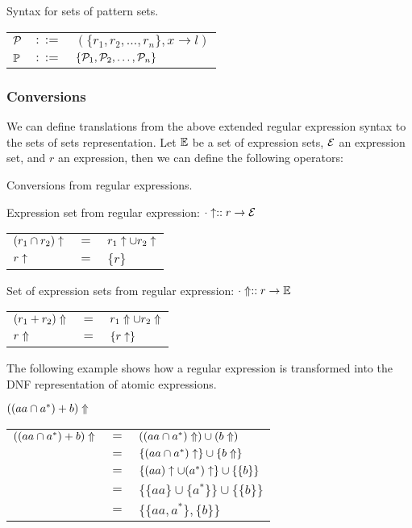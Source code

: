\begin{defn}
   Syntax for sets of pattern sets.

   \begin{tabular}{lll}
      $\mathcal{P}$	& $::=$ & $(\{r_1, r_2, \dots, r_n\}, x \to l)$ \\
      $\mathbb{P}$	& $::=$ & $\{\mathcal{P}_1, \mathcal{P}_2, \dots, \mathcal{P}_n\}$ \\
   \end{tabular}
\end{defn}


\subsubsection{Conversions}

We can define translations from the above extended regular expression syntax to
the sets of sets representation. Let $\mathbb{E}$ be a set of expression sets,
$\mathcal{E}$ an expression set, and $r$ an expression, then we can define the
following operators:

\begin{defn}
   Conversions from regular expressions.

   Expression set from regular expression:
   $\cdot\uparrow :: r \to \mathcal{E}$

   \begin{tabular}{lll}
      $(r_1 \cap r_2)\uparrow$	& $=$	& $r_1\uparrow \cup r_2\uparrow$	\\
      $r\uparrow$			& $=$	& $\{r\}$			\\
   \end{tabular}

   Set of expression sets from regular expression:
   $\cdot\Uparrow :: r \to \mathbb{E}$

   \begin{tabular}{lll}
      $(r_1 + r_2)\Uparrow$	& $=$	& $r_1\Uparrow \cup r_2\Uparrow$	\\
      $r\Uparrow$		& $=$	& $\{r\uparrow\}$			\\
   \end{tabular}
\end{defn}

The following example shows how a regular expression is transformed into the DNF
representation of atomic expressions.

\begin{eg}
   $((aa \cap a^*) + b)\Uparrow$

   \begin{tabular}{lll}
      $((aa \cap a^*) + b)\Uparrow$
      & $=$	& $((aa \cap a^*)\Uparrow) \cup (b\Uparrow)$		\\
      & $=$	& $\{(aa \cap a^*)\uparrow\} \cup \{b\Uparrow\}$		\\
      & $=$	& $\{(aa)\uparrow \cup (a^*)\uparrow\} \cup \{\{b\}\}$	\\
      & $=$	& $\{\{aa\} \cup \{a^*\}\} \cup \{\{b\}\}$			\\
      & $=$	& $\{\{aa, a^*\}, \{b\}\}$					\\
   \end{tabular}
\end{eg}

